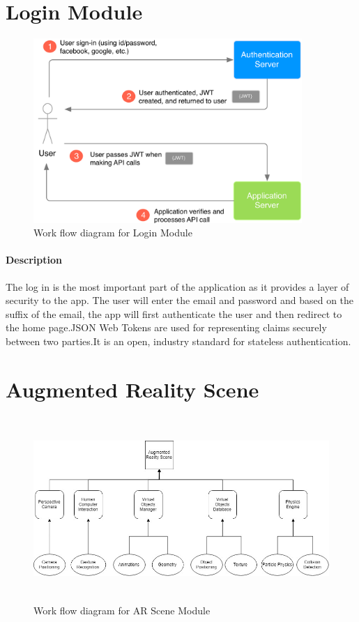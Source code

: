 \documentclass[BTech]{srmuthesis}
\begin{document}
\section{Login Module}
\begin{figure}[htbp]
	\centering
	\includegraphics[width=\linewidth, height=7cm,keepaspectratio]{loginmodule}
	\caption{Work flow diagram for Login Module}
	\label{fig:loginmodule}
\end{figure} 
\paragraph{Description}
The log in is the most important part of the application as it  provides a layer of security to the app. The user will enter the email and password and based on the suffix of the email, the app will first authenticate the user and then redirect to the home page.JSON Web Tokens are used for representing claims securely between two parties.It is an open, industry standard for stateless authentication.
\section{Augmented Reality Scene}
\begin{figure}[htbp]
	\centering
	\includegraphics[width=\linewidth, height=7cm,keepaspectratio]{arscenemodule}
	\caption{Work flow diagram for AR Scene Module}
	\label{fig:hodmodule}
\end{figure} 
\end{document}
